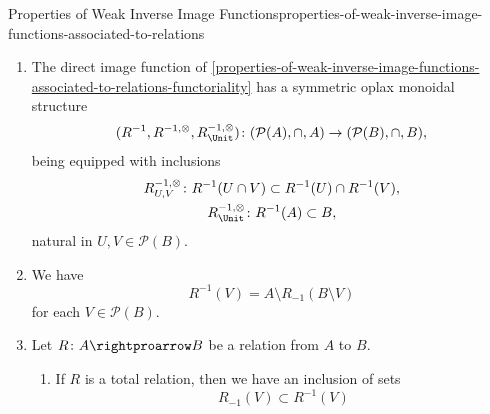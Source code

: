 \begin{proposition}{Properties of Weak Inverse Image Functions}{properties-of-weak-inverse-image-functions-associated-to-relations}
\begin{enumerate}
\[\begin{gathered}
                    R^{-1,\otimes}_{U,V}   \colon R^{-1}(U)\cup R^{-1}(V) \rightequalsarrow R^{-1}(U\cup V),\\
                    R^{-1,\otimes}_{\Unit} \colon \emptyset               \rightequalsarrow \emptyset,
                \end{gathered}
            \]%
            natural in $U,V\in\mathcal{P}(B)$.
        \item\label{properties-of-weak-inverse-image-functions-associated-to-relations-symmetric-oplax-monoidality-with-respect-to-intersections}The direct image function of \cref{properties-of-weak-inverse-image-functions-associated-to-relations-functoriality} has a symmetric oplax monoidal structure
            \[
                (R^{-1},R^{-1,\otimes},R^{-1,\otimes}_{\Unit})
                \colon
                (\mathcal{P}(A),\cap,A)
                \to
                (\mathcal{P}(B),\cap,B),
            \]%
            being equipped with inclusions%
            \[
                \begin{gathered}
                    R^{-1,\otimes}_{U,V}   \colon R^{-1}(U\cap V) \subset R^{-1}(U)\cap R^{-1}(V),\\
                    R^{-1,\otimes}_{\Unit} \colon R^{-1}(A)       \subset B,
                \end{gathered}
            \]%
            natural in $U,V\in\mathcal{P}(B)$.
        \item\label{properties-of-weak-inverse-image-functions-associated-to-relations-interaction-with-strong-inverse-images-1}We have
            \[
                R^{-1}(V)%
                =%
                A\setminus R_{-1}(B\setminus V)
            \]%
            for each $V\in\mathcal{P}(B)$.
        \item\label{properties-of-weak-inverse-image-functions-associated-to-relations-interaction-with-strong-inverse-images-2}Let $R\colon A\rightproarrow B$ be a relation from $A$ to $B$.
            \begin{enumerate}
                \item\label{properties-of-weak-inverse-image-functions-associated-to-relations-interaction-with-strong-inverse-images-2-a}If $R$ is a total relation, then we have an inclusion of sets
                    \[
                        R_{-1}(V)
                        \subset
                        R^{-1}(V)
\]
\end{enumerate}
\end{enumerate}
\end{proposition}
